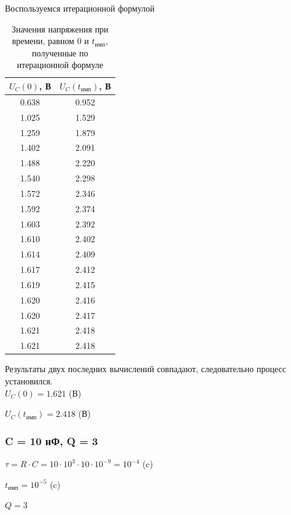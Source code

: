 	Воспользуемся итерационной формулой
\begin{table}[H]

	\begin{center}
	\caption{Значения напряжения при времени, равном $0$ и $t_\text{имп}$, полученные по итерационной формуле}
	\begin{tabular}{|c|c|}
		\hline 
		$U_C(0)$, В & $U_C(t_\text{имп})$, В \\ 
		\hline 
		0.638 & 0.952 \\ 
		\hline 
		1.025 & 1.529 \\ 
		\hline 
		1.259 & 1.879 \\ 
		\hline 
		1.402 & 2.091 \\ 
		\hline 
		1.488 & 2.220 \\ 
		\hline 
		1.540 & 2.298 \\ 
		\hline 
		1.572 & 2.346 \\ 
		\hline 
		1.592 & 2.374 \\ 
		\hline 
		1.603 & 2.392 \\ 
		\hline 
		1.610 & 2.402 \\ 
		\hline 
		1.614 & 2.409 \\ 
		\hline 
		1.617 & 2.412 \\ 
		\hline 
		1.619 & 2.415 \\ 
		\hline 
		1.620 & 2.416 \\ 
		\hline 
		1.620 & 2.417 \\ 
		\hline 
		1.621 & 2.418 \\ 
		\hline 
		1.621 & 2.418 \\ 
		\hline 
		\end{tabular} 	
		
	\end{center}
\end{table}
	Результаты двух последних вычислений совпадают, следовательно процесс установился.\\
	
	$U_C(0) = 1.621$ (В)	
	
	$U_C(t_\text{имп}) = 2.418$ (В)
	

\subsubsection{C = 10 нФ, Q = 3}

$\tau = R \cdot C = 10 \cdot 10^3 \cdot 10 \cdot 10^{-9} = 10^{-4}$ (c)
		
		$t_\text{имп} = 10^{-5}$ (c)
		
		$Q = 3$
		
